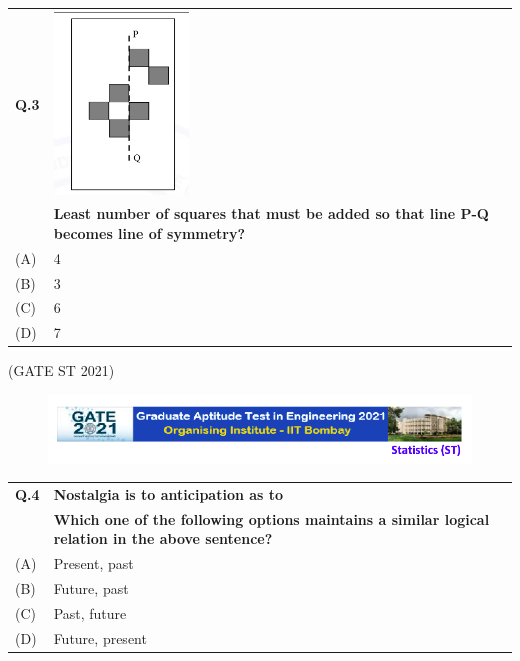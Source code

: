 \documentclass[journal,12pt,onecolumn]{IEEEtran}
\theoremstyle{remark}
\begin{document}
\Large\begin{tabular}{|p{1cm}|p{12.5cm}|}
\hline
\textbf{Q.3} & \includegraphics[width=0.3\textwidth]{3.png} \\ &\textbf{Least number of squares that must be added so that line P-Q becomes line of symmetry?}  \bigskip
\\
\hline
(A) & 4 \\
\hline
(B) & 3 \\
\hline
(C) & 6 \\
\hline
(D) & 7 \\
\hline
\end{tabular}

\bigskip
\hfill (GATE ST 2021)
\\
\begin{figure}
\huge\centering
    \huge\includegraphics[width=1\linewidth]{figs/0.png}
\end{figure}


\Large\begin{tabular}{|p{1cm}|p{12.5cm}|}
\hline

\textbf{Q.4} & \textbf{Nostalgia is to anticipation as \underline{\phantom{imagine}} to \underline{\phantom{imagine}} }\\ &
\textbf{Which one of the following options maintains a similar logical relation in the above sentence? }\\
\hline
(A) & Present, past \\
\hline
(B) & Future, past \\
\hline
(C) & Past, future \\
\hline
(D) & Future, present \\
\hline
\end{tabular}
\end{document}
